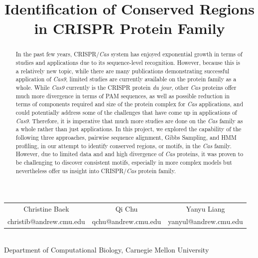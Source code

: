 \documentclass[11pt, oneside]{article}
\begin{document}
\title{\textbf{Identification of Conserved Regions\\ in CRISPR Protein Family}\\ }

\maketitle

\begin{center}
\begin{tabular}{ c c c }
 Christine Baek & Qi Chu & Yanyu Liang \\ 
christib@andrew.cmu.edu & qchu@andrew.cmu.edu & yanyul@andrew.cmu.edu \\     
\end{tabular}\\
\smallskip
\smallskip
Department of Computational Biology, Carnegie Mellon University
\end{center}

\bigskip

\begin{abstract}
In the past few years, CRISPR/\textit{Cas} system has enjoyed exponential growth in terms of studies and applications due to its sequence-level recognition. However, because this is a relatively new topic, while there are many publications demonstrating successful application of \textit{Cas9}, limited studies are currently available on the protein family as a whole. While \textit{Cas9} currently is the CRISPR protein \textit{du jour}, other \textit{Cas} proteins offer much more divergence in terms of PAM sequences, as well as possible reduction in terms of components required and size of the protein complex for \textit{Cas} applications, and could potentially address some of the challenges that have come up in applications of \textit{Cas9}. Therefore, it is imperative that much more studies are done on the \textit{Cas} family as a whole rather than just applications. In this project, we explored the capability of the following three approaches, pairwise sequence alignment, Gibbs Sampling, and HMM profiling, in our attempt to identify conserved regions, or motifs, in the \textit{Cas} family. However, due to limited data and and high divergence of \textit{Cas} proteins, it was proven to be challenging to discover consistent motifs, especially in more complex models but nevertheless offer us insight into CRISPR/\textit{Cas} protein family. 
\end{abstract}
\end{document}
